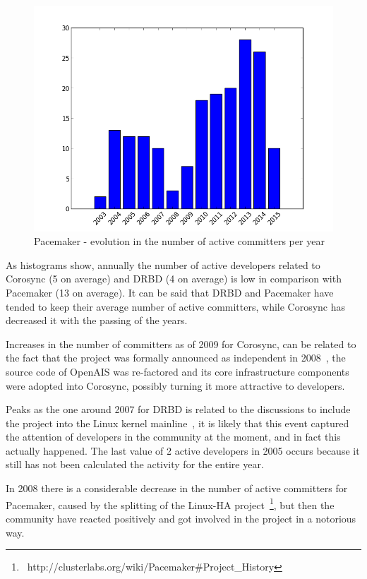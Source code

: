 \documentclass[a4paper, 12pt]{book}
\begin{document}
    \begin{figure}[H]
      \centering
      \includegraphics[scale=0.45]{barchart_p.png}
      \caption[Active committers for Pacemaker]{Pacemaker - evolution in the number of active committers per year}
      \label{fig:barchart_p}
    \end{figure}


\noindent As histograms show, annually the number of active developers related to Corosync (5 on average) and DRBD (4 on average) is low in comparison with Pacemaker (13 on average). It can be said that DRBD and Pacemaker have tended to keep their average number of active committers, while Corosync has decreased it with the passing of the years.\bigskip

\noindent Increases in the number of committers as of 2009 for Corosync, can be related to the fact that the project was formally announced as independent in 2008~\cite{CRS}, the source code of OpenAIS was re-factored and its core infrastructure components were adopted into Corosync, possibly turning it more attractive to developers.\bigskip

\noindent Peaks as the one around 2007 for DRBD is related to the discussions to include the project into the Linux kernel mainline~\cite{ELDRBD}, it is likely that this event captured the attention of developers in the community at the moment, and in fact this actually happened. The last value of 2 active developers in 2005 occurs because it still has not been calculated the activity for the entire year.\bigskip

\noindent In 2008 there is a considerable decrease in the number of active committers for Pacemaker, caused by the splitting of the Linux-HA project~\footnote{{\tiny\ http://clusterlabs.org/wiki/Pacemaker\#Project\_History}}, but then the community have reacted positively and got involved in the project in a notorious way.\bigskip
\end{document}
